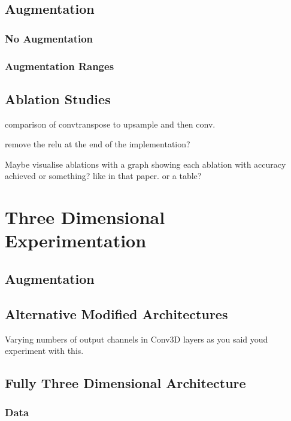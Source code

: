 \subsection{Augmentation}
\label{sec:evalaugmentation}

\subsubsection{No Augmentation}

\subsubsection{Augmentation Ranges}

\subsection{Ablation Studies}

comparison of convtranspose to upsample and then conv.

remove the relu at the end of the implementation?

Maybe visualise ablations with a graph showing each ablation with accuracy achieved or something? like in that paper. or a table?

\section{Three Dimensional Experimentation}

\subsection{Augmentation}

\subsection{Alternative Modified Architectures}

Varying numbers of output channels in Conv3D layers as you said youd experiment with this.

\subsection{Fully Three Dimensional Architecture}

\subsubsection{Data}

